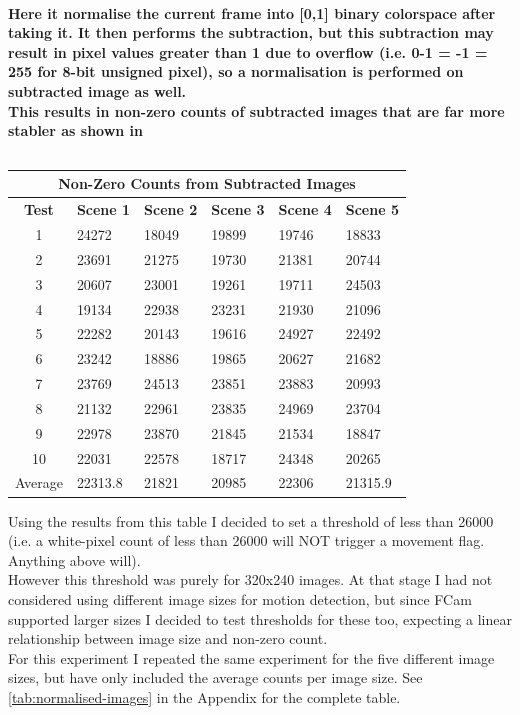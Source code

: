 \documentclass[11pt]{article} %
\begin{document}
\paragraph{Here it normalise the current frame into [0,1] binary colorspace after taking it. It then performs the subtraction, but this subtraction may result in pixel values greater than 1 due to overflow (i.e. 0-1 = -1 = 255 for 8-bit unsigned pixel), so a normalisation is performed on subtracted image as well. \\
This results in non-zero counts of subtracted images that are far more stabler as shown in }
\begin{center}
\begin{table}[!htbp]
	\begin{tabular}{| c | l | l | l | l | l | }
\hline
\multicolumn{6}{|c|}{\bf Non-Zero Counts from Subtracted Images} \\
\hline
\bf Test	&\bf Scene 1	&\bf Scene 2	&\bf Scene 3	&\bf Scene 4	&\bf Scene 5	\\ \hline
1	&24272	&18049	&19899	&19746	&18833\\
2	&23691	&21275	&19730	&21381	&20744\\
3	&20607	&23001	&19261	&19711	&24503\\
4	&19134	&22938	&23231	&21930	&21096\\
5	&22282	&20143	&19616	&24927	&22492\\
6	&23242	&18886	&19865	&20627	&21682\\
7	&23769	&24513	&23851	&23883	&20993\\
8	&21132	&22961	&23835	&24969	&23704\\
9	&22978	&23870	&21845	&21534	&18847\\
10	&22031	&22578	&18717	&24348	&20265\\ \hline
Average	&22313.8	&21821	&20985	&22306	&21315.9	\\ \hline
	\end{tabular}
\caption{}
\vspace{-8pt}
\label{tab:sub2}
\end{table}
\end{center}
Using the results from this table I decided to set a threshold of less than 26000 (i.e. a white-pixel count of less than 26000 will NOT trigger a movement flag. Anything above will). 
\\However this threshold was purely for 320x240 images. At that stage I had not considered using different image sizes  for motion detection, but since FCam supported larger sizes I decided to test thresholds for these too, expecting a linear relationship between image size and non-zero count.
\\For this experiment I repeated the same experiment for the five different image sizes, but have only included the average counts per image size. See \ref{tab:normalised-images} in the Appendix for the complete table.\\
\end{document}
